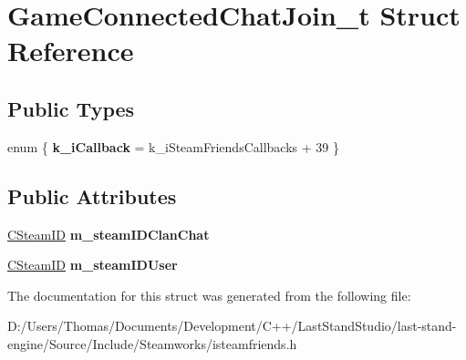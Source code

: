 \hypertarget{structGameConnectedChatJoin__t}{}\section{Game\+Connected\+Chat\+Join\+\_\+t Struct Reference}
\label{structGameConnectedChatJoin__t}
\subsection*{Public Types}
\begin{DoxyCompactItemize}
\item 
\hypertarget{structGameConnectedChatJoin__t_ae4a20e790211e4a66379b73dff5769be}{}enum \{ {\bfseries k\+\_\+i\+Callback} = k\+\_\+i\+Steam\+Friends\+Callbacks + 39
 \}\label{structGameConnectedChatJoin__t_ae4a20e790211e4a66379b73dff5769be}

\end{DoxyCompactItemize}
\subsection*{Public Attributes}
\begin{DoxyCompactItemize}
\item 
\hypertarget{structGameConnectedChatJoin__t_a14a286f8587b2d9ef08b0e784d1b2e38}{}\hyperlink{classCSteamID}{C\+Steam\+I\+D} {\bfseries m\+\_\+steam\+I\+D\+Clan\+Chat}\label{structGameConnectedChatJoin__t_a14a286f8587b2d9ef08b0e784d1b2e38}

\item 
\hypertarget{structGameConnectedChatJoin__t_add811d90fbe12f189e7281988a595cf8}{}\hyperlink{classCSteamID}{C\+Steam\+I\+D} {\bfseries m\+\_\+steam\+I\+D\+User}\label{structGameConnectedChatJoin__t_add811d90fbe12f189e7281988a595cf8}

\end{DoxyCompactItemize}


The documentation for this struct was generated from the following file\+:\begin{DoxyCompactItemize}
\item 
D\+:/\+Users/\+Thomas/\+Documents/\+Development/\+C++/\+Last\+Stand\+Studio/last-\/stand-\/engine/\+Source/\+Include/\+Steamworks/isteamfriends.\+h\end{DoxyCompactItemize}
